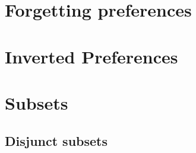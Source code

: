 \section{Forgetting preferences}
\section{Inverted Preferences}

\section{Subsets}
\subsection{Disjunct subsets}